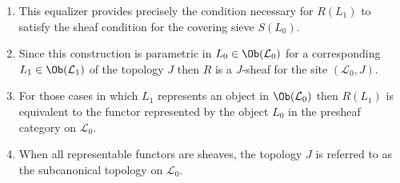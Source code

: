 \begin{frame}
\begin{enumerate}
\item This equalizer provides precisely the condition necessary for $R(L_1)$ to satisfy the sheaf condition for the covering sieve $S(L_0)$. 
\item Since this construction is parametric in $L_0 \in \Ob(\mathcal{L}_0)$ for a corresponding $L_1 \in \Ob(\mathcal{L}_1)$ of the topology $J$ then $R$ is a $J$-sheaf for the site $(\mathcal{L}_0,J)$. 
\item For those cases in which $L_1$ represents an object in $\Ob(\mathcal{L}_0)$ then $R(L_1)$ is equivalent to the functor represented by the object $L_0$ in the presheaf category on $\mathcal{L}_0$. 
\item When all representable functors are sheaves, the topology $J$ is referred to as the subcanonical topology on $\mathcal{L}_0$.
\end{enumerate}
\end{frame}